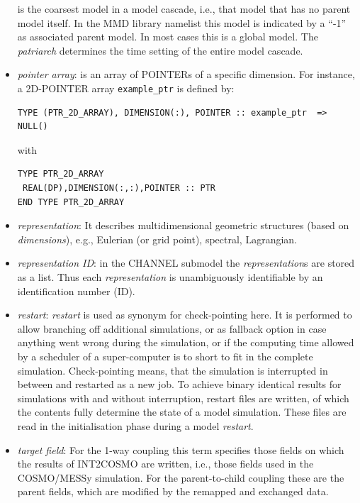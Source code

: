 \documentclass[11pt,twoside]{article}
\begin{document}
\begin{appendix}
\begin{itemize}
  is the coarsest model in a  model cascade, i.e., that model that has
  no parent model itself. In the MMD library 
namelist this model is indicated by a ``-1'' as associated parent model.
 In most cases this is a global model.  The {\it patriarch}
determines the time setting of the entire model cascade. 
\item {\it pointer array}: is an array of {\footnotesize POINTER}s of a specific dimension.
  For instance, a 2D-{\footnotesize POINTER} array \verb|example_ptr| is defined by:
\vspace*{-0.3cm}
{\small
\begin{verbatim}
TYPE (PTR_2D_ARRAY), DIMENSION(:), POINTER :: example_ptr  => NULL()
\end{verbatim}
}
\vspace*{-0.3cm}
with
\vspace*{-0.3cm}
{\small
\begin{verbatim}
TYPE PTR_2D_ARRAY
 REAL(DP),DIMENSION(:,:),POINTER :: PTR
END TYPE PTR_2D_ARRAY
\end{verbatim}
}
\vspace*{-0.3cm}
\item {\it representation}: It describes multidimensional geometric
structures (based on {\it dimensions}), e.g., Eulerian (or grid point),
spectral, Lagrangian.
\item {\it representation ID}: in the CHANNEL submodel the {\it representation}s
are stored as a list. Thus each {\it representation} is unambiguously 
identifiable by an identification number (ID).

\item {\it restart}:  {\it restart} is used as synonym for check-pointing here.
It is performed to allow branching off additional simulations, or as fallback
option in case anything went wrong during the simulation, or if the computing
time allowed by a scheduler of a super-computer is to short to fit in 
the complete simulation. Check-pointing means, that the simulation is
interrupted in between 
and restarted as a new job. To achieve binary identical results
for simulations with and without interruption, restart files are written, of
 which the contents fully determine the state of a model simulation. These files
 are read in the initialisation phase during a model {\it restart}.
\item {\it target field}: For the 1-way coupling this term specifies those
fields on which the results 
of INT2COSMO are written, i.e., those fields used in the COSMO/MESSy
simulation. For the parent-to-child coupling these are the parent fields,
which are modified by the remapped and exchanged data.


\end{itemize}
\end{appendix}
\end{document}
